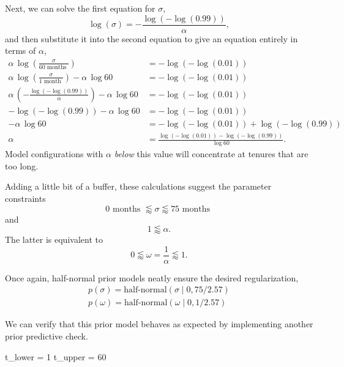 \documentclass[
  letterpaper,
  DIV=11,
  numbers=noendperiod]{scrartcl}
\newenvironment{Shaded}{\begin{snugshade}}{\end{snugshade}}
\newcommand{\DecValTok}[1]{\textcolor[rgb]{0.68,0.00,0.00}{#1}}
\newcommand{\NormalTok}[1]{\textcolor[rgb]{0.00,0.23,0.31}{#1}}
\newcommand{\OperatorTok}[1]{\textcolor[rgb]{0.37,0.37,0.37}{#1}}
\begin{document}
Next, we can solve the first equation for \(\sigma\), \[
\log( \sigma) = - \frac{ \log(-\log(0.99)) }{ \alpha },
\] and then substitute it into the second equation to give an equation
entirely in terms of \(\alpha\), \begin{align*}
\alpha \,
\log \left( \frac{ \sigma }{ 60 \text{ months } } \right)
&=
-\log(-\log(0.01))
\\
\alpha \,
\log \left( \frac{ \sigma }{ 1 \text{ month } } \right)
- \alpha \, \log 60
&=
-\log(-\log(0.01))
\\
\alpha \,
\left( - \frac{ \log(-\log(0.99)) }{ \alpha } \right)
- \alpha \, \log 60
&=
-\log(-\log(0.01))
\\
- \log(-\log(0.99))
- \alpha \, \log 60
&=
-\log(-\log(0.01))
\\
- \alpha \, \log 60
&=
-\log(-\log(0.01)) + \log(-\log(0.99))
\\
\alpha
&=
\frac{ \log(-\log(0.01)) - \log(-\log(0.99)) }{ \log 60 }.
\end{align*} Model configurations with \(\alpha\) \emph{below} this
value will concentrate at tenures that are too long.

Adding a little bit of a buffer, these calculations suggest the
parameter constraints \[
0 \text{ months } \lessapprox
\sigma \lessapprox
75 \text{ months }
\] and \[
1 \lessapprox \alpha.
\] The latter is equivalent to \[
0 \lessapprox \omega = \frac{1}{\alpha} \lessapprox 1.
\]

Once again, half-normal prior models neatly ensure the desired
regularization, \begin{align*}
p( \sigma ) = \text{half-normal}( \sigma \mid 0, 75 / 2.57 )
\\
p( \omega ) = \text{half-normal}( \omega \mid 0, 1 / 2.57)
\end{align*}

We can verify that this prior model behaves as expected by implementing
another prior predictive check.

\begin{Shaded}
\begin{Highlighting}[]
\NormalTok{t\_lower }\OperatorTok{=} \DecValTok{1}
\NormalTok{t\_upper }\OperatorTok{=} \DecValTok{60}
\end{Highlighting}
\end{Shaded}
\end{document}
